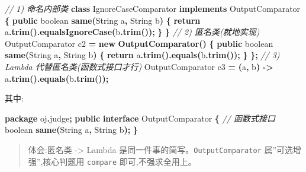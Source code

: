 \documentclass[
  11pt,
]{ctexart}
\newenvironment{Shaded}{\begin{snugshade}}{\end{snugshade}}
\newcommand{\BuiltInTok}[1]{#1}
\newcommand{\CommentTok}[1]{\textcolor[rgb]{0.56,0.35,0.01}{\textit{#1}}}
\newcommand{\ControlFlowTok}[1]{\textcolor[rgb]{0.13,0.29,0.53}{\textbf{#1}}}
\newcommand{\DataTypeTok}[1]{\textcolor[rgb]{0.13,0.29,0.53}{#1}}
\newcommand{\FunctionTok}[1]{\textcolor[rgb]{0.13,0.29,0.53}{\textbf{#1}}}
\newcommand{\ImportTok}[1]{#1}
\newcommand{\KeywordTok}[1]{\textcolor[rgb]{0.13,0.29,0.53}{\textbf{#1}}}
\newcommand{\NormalTok}[1]{#1}
\newcommand{\OperatorTok}[1]{\textcolor[rgb]{0.81,0.36,0.00}{\textbf{#1}}}
\begin{document}
\begin{Shaded}
\begin{Highlighting}[]
\CommentTok{// 1) 命名内部类}
\KeywordTok{class}\NormalTok{ IgnoreCaseComparator }\KeywordTok{implements}\NormalTok{ OutputComparator }\OperatorTok{\{}
    \KeywordTok{public} \DataTypeTok{boolean} \FunctionTok{same}\OperatorTok{(}\BuiltInTok{String}\NormalTok{ a}\OperatorTok{,} \BuiltInTok{String}\NormalTok{ b}\OperatorTok{)} \OperatorTok{\{} \ControlFlowTok{return}\NormalTok{ a}\OperatorTok{.}\FunctionTok{trim}\OperatorTok{().}\FunctionTok{equalsIgnoreCase}\OperatorTok{(}\NormalTok{b}\OperatorTok{.}\FunctionTok{trim}\OperatorTok{());} \OperatorTok{\}}
\OperatorTok{\}}
\CommentTok{// 2) 匿名类(就地实现)}
\NormalTok{OutputComparator c2 }\OperatorTok{=} \KeywordTok{new} \FunctionTok{OutputComparator}\OperatorTok{()} \OperatorTok{\{}
    \KeywordTok{public} \DataTypeTok{boolean} \FunctionTok{same}\OperatorTok{(}\BuiltInTok{String}\NormalTok{ a}\OperatorTok{,} \BuiltInTok{String}\NormalTok{ b}\OperatorTok{)} \OperatorTok{\{} \ControlFlowTok{return}\NormalTok{ a}\OperatorTok{.}\FunctionTok{trim}\OperatorTok{().}\FunctionTok{equals}\OperatorTok{(}\NormalTok{b}\OperatorTok{.}\FunctionTok{trim}\OperatorTok{());} \OperatorTok{\}}
\OperatorTok{\};}
\CommentTok{// 3) Lambda 代替匿名类(函数式接口才行)}
\NormalTok{OutputComparator c3 }\OperatorTok{=} \OperatorTok{(}\NormalTok{a}\OperatorTok{,}\NormalTok{ b}\OperatorTok{)} \OperatorTok{{-}\textgreater{}}\NormalTok{ a}\OperatorTok{.}\FunctionTok{trim}\OperatorTok{().}\FunctionTok{equals}\OperatorTok{(}\NormalTok{b}\OperatorTok{.}\FunctionTok{trim}\OperatorTok{());}
\end{Highlighting}
\end{Shaded}

其中:

\begin{Shaded}
\begin{Highlighting}[]
\KeywordTok{package}\ImportTok{ oj}\OperatorTok{.}\ImportTok{judge}\OperatorTok{;}
\KeywordTok{public} \KeywordTok{interface}\NormalTok{ OutputComparator }\OperatorTok{\{}     \CommentTok{// 函数式接口}
    \DataTypeTok{boolean} \FunctionTok{same}\OperatorTok{(}\BuiltInTok{String}\NormalTok{ a}\OperatorTok{,} \BuiltInTok{String}\NormalTok{ b}\OperatorTok{);}
\OperatorTok{\}}
\end{Highlighting}
\end{Shaded}

\begin{quote}
体会:匿名类 -\textgreater{} Lambda
是同一件事的简写。\texttt{OutputComparator} 属''可选增强'',核心判题用
\texttt{compare} 即可,不强求全用上。
\end{quote}
\end{document}
